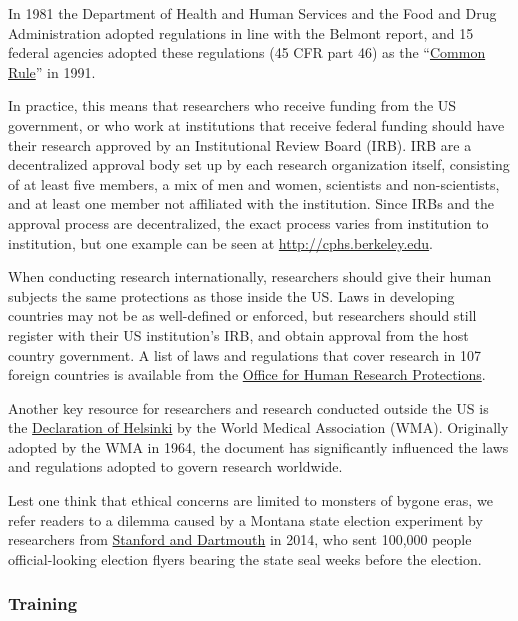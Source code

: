 \documentclass[12pt] {article}
\begin{document}
In 1981 the Department of Health and Human Services and the Food and
Drug Administration adopted regulations in line with the Belmont report,
and 15 federal agencies adopted these regulations (45 CFR part 46) as
the ``\href{http://www.hhs.gov/ohrp/index.html}{Common Rule}'' in 1991. 

In practice, this means that researchers who receive funding from the US
government, or who work at institutions that receive federal funding should have their research approved by an Institutional Review Board (IRB). IRB are a decentralized approval
body set up by each research organization itself, consisting of at least
five members, a mix of men and women, scientists and non-scientists, and
at least one member not affiliated with the institution. Since IRBs and
the approval process are decentralized, the exact process varies from
institution to institution, but one example can be seen at
\url{http://cphs.berkeley.edu}.

When conducting research internationally, researchers should give their
human subjects the same protections as those inside the US. Laws in
developing countries may not be as well-defined or enforced, but
researchers should still register with their US institution's IRB, and
obtain approval from the host country government. A list of laws and
regulations that cover research in 107 foreign countries is available
from the \href{http://www.hhs.gov/ohrp/international/intlcompilation/2014intlcomp.pdf.pdf}
{Office for Human Research Protections}.

Another key resource for researchers and research conducted outside the
US is the \href{http://www.wma.net/en/30publications/10policies/b3/index.html}{Declaration of Helsinki} by the World Medical Association
(WMA). Originally adopted by the WMA in 1964, the document has significantly
influenced the laws and regulations adopted to govern research
worldwide.

Lest one think that ethical concerns are limited to monsters of bygone
eras, we refer readers to a dilemma caused by a Montana state election experiment by
researchers from \href{http://www.washingtonpost.com/blogs/monkey-cage/wp/2014/11/03/ethics-and-research-in-comparative-politics/}{Stanford and Dartmouth} in 2014, who sent 100,000 people official-looking election flyers bearing the state seal weeks before the election.

\subsubsection{Training}\label{training}
\end{document}
